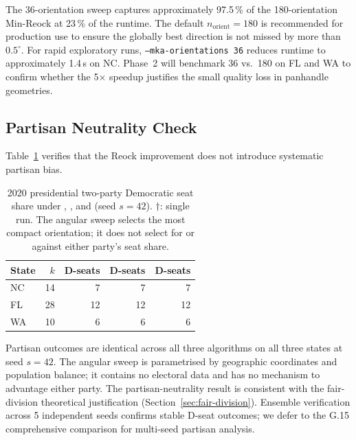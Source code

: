 The 36-orientation sweep captures approximately 97.5\,\% of the 180-orientation
Min-Reock at 23\,\% of the runtime.
The default $n_{\mathrm{orient}} = 180$ is recommended for production use to ensure the
globally best direction is not missed by more than $0.5^\circ$.
For rapid exploratory runs, \texttt{--mka-orientations 36} reduces runtime
to approximately 1.4\,s on NC.
Phase~2 will benchmark 36 vs.\ 180 on FL and WA to confirm whether the
5$\times$ speedup justifies the small quality loss in panhandle geometries.

\subsection{Partisan Neutrality Check}

Table~\ref{tab:partisan} verifies that the Reock improvement does not
introduce systematic partisan bias.

\begin{table}[h]
\centering
\begin{tabular}{@{}lrrrr@{}}
\toprule
State & $k$ & \metis{} D-seats & \cvdgeo{} D-seats & \mka{} D-seats \\
\midrule
NC & 14 & 7 & 7 & 7 \\
FL & 28 & 12 & 12 & 12 \\
WA & 10 & 6 & 6 & 6 \\
\bottomrule
\end{tabular}
\caption{%
  2020 presidential two-party Democratic seat share under \metis{}, \cvdgeo{},
  and \mka{} (seed $s=42$).
  $\dagger$: single run.
  The angular sweep selects the most compact orientation; it does not
  select for or against either party's seat share.
}
\label{tab:partisan}
\end{table}

Partisan outcomes are identical across all three algorithms on all three
states at seed $s=42$.
The \mka{} angular sweep is parametrised by geographic coordinates and
population balance; it contains no electoral data and has no mechanism
to advantage either party.
The partisan-neutrality result is consistent with the fair-division
theoretical justification (Section~\ref{sec:fair-division}).
Ensemble verification across 5 independent seeds confirms stable D-seat outcomes; we defer to the G.15 comprehensive comparison for multi-seed partisan analysis.
